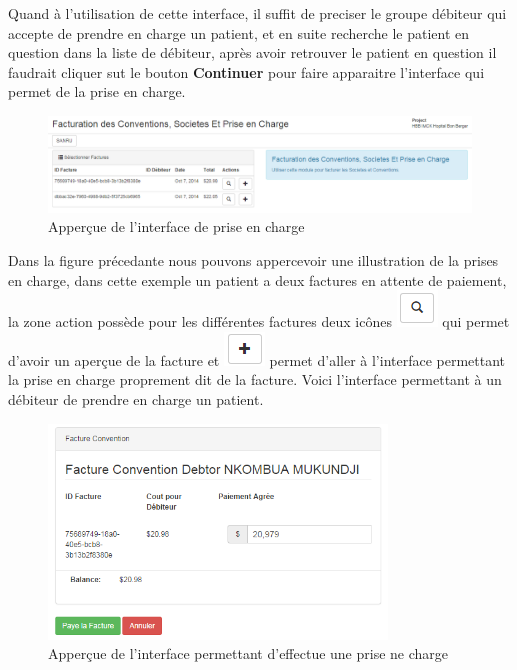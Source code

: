 \documentclass[12pt,a4paper]{report}
\begin{document}
Quand à l'utilisation de cette interface, il suffit de preciser le groupe débiteur qui accepte de prendre en charge un patient, et en suite recherche le patient en question dans la liste de débiteur, après avoir retrouver le patient en question il faudrait cliquer sut le bouton  \textbf{Continuer} pour faire apparaitre l'interface qui permet de la prise en charge.

\begin{figure}[h]
\begin{center}
\includegraphics[width=14cm]{pic/FactPrCharge.png}
\end{center}
\caption{Apperçue de l'interface de prise en charge}
\label{Apperçue de l'interface de prise en charge}
\end{figure}

Dans la figure précedante nous pouvons appercevoir une illustration de la prises en charge, dans cette exemple un patient a deux factures en attente de paiement, la zone action possède pour les différentes factures deux icônes \includegraphics[scale=0.7]{pic/LoopBlack.png} qui permet d'avoir un aperçue de la facture et \includegraphics[scale=0.7]{pic/plusBlack.png} permet d'aller à l'interface permettant la prise en charge proprement dit de la facture. 
Voici l'interface permettant à un débiteur de prendre en charge un patient.

\begin{figure}[h]
\begin{center}
\includegraphics[width=9cm]{pic/FactConv1.png}
\end{center}
\caption{Apperçue de l'interface permettant d'effectue une prise ne charge}
\label{Apperçue de l'interface permettant d'effectue une prise ne charge}
\end{figure}
\end{document}
